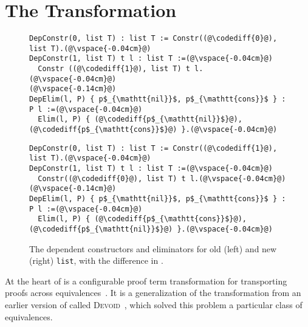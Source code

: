 \section{The Transformation}
\label{sec:key2}

\begin{figure*}
\begin{minipage}{0.48\textwidth}
\begin{lstlisting}
DepConstr(0, list T) : list T := Constr((@\codediff{0}@), list T).(@\vspace{-0.04cm}@)
DepConstr(1, list T) t l : list T :=(@\vspace{-0.04cm}@)
  Constr ((@\codediff{1}@), list T) t l.(@\vspace{-0.04cm}@)
(@\vspace{-0.14cm}@)
DepElim(l, P) { p$_{\mathtt{nil}}$, p$_{\mathtt{cons}}$ } : P l :=(@\vspace{-0.04cm}@)
  Elim(l, P) { (@\codediff{p$_{\mathtt{nil}}$}@), (@\codediff{p$_{\mathtt{cons}}$}@) }.(@\vspace{-0.04cm}@)
\end{lstlisting}
\end{minipage}
\hfill
\begin{minipage}{0.48\textwidth}
\begin{lstlisting}
DepConstr(0, list T) : list T := Constr((@\codediff{1}@), list T).(@\vspace{-0.04cm}@)
DepConstr(1, list T) t l : list T :=(@\vspace{-0.04cm}@)
  Constr((@\codediff{0}@), list T) t l.(@\vspace{-0.04cm}@)
(@\vspace{-0.14cm}@)
DepElim(l, P) { p$_{\mathtt{nil}}$, p$_{\mathtt{cons}}$ } : P l :=(@\vspace{-0.04cm}@)
  Elim(l, P) { (@\codediff{p$_{\mathtt{cons}}$}@), (@\codediff{p$_{\mathtt{nil}}$}@) }.(@\vspace{-0.04cm}@)
\end{lstlisting}
\end{minipage}
\vspace{-0.3cm}
\caption{The dependent constructors and eliminators for old (left) and new (right) \lstinline{list}, with the difference in .}
\vspace{-0.1cm}
\label{fig:listconfig}
\end{figure*}

At the heart of \toolname is a configurable proof term transformation for transporting
proofs across equivalences~\href{https://github.com/uwplse/pumpkin-pi/blob/v2.0.0/plugin/src/automation/lift/lift.ml}{}. %
It is a generalization of the transformation from an earlier version of \toolname called
\textsc{Devoid}~\cite{Ringer2019}, which solved this problem a particular class of equivalences.

